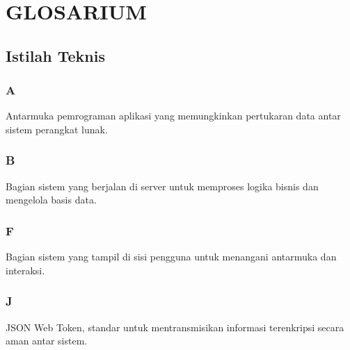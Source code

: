 
\chapter*{GLOSARIUM}
\sloppy

\section*{Istilah Teknis}

\subsection*{A}
\begin{description}[leftmargin=3.5cm, style=sameline, font=\normalfont]
    \item[API] Antarmuka pemrograman aplikasi yang memungkinkan pertukaran data antar sistem perangkat lunak.
\end{description}

\subsection*{B}
\begin{description}[leftmargin=3.5cm, style=sameline, font=\normalfont]
    \item[Backend] Bagian sistem yang berjalan di server untuk memproses logika bisnis dan mengelola basis data.
\end{description}

\subsection*{F}
\begin{description}[leftmargin=3.5cm, style=sameline, font=\normalfont]
    \item[Frontend] Bagian sistem yang tampil di sisi pengguna untuk menangani antarmuka dan interaksi.
\end{description}

\subsection*{J}
\begin{description}[leftmargin=3.5cm, style=sameline, font=\normalfont]
    \item[JWT] JSON Web Token, standar untuk mentransmisikan informasi terenkripsi secara aman antar sistem.
\end{description}

